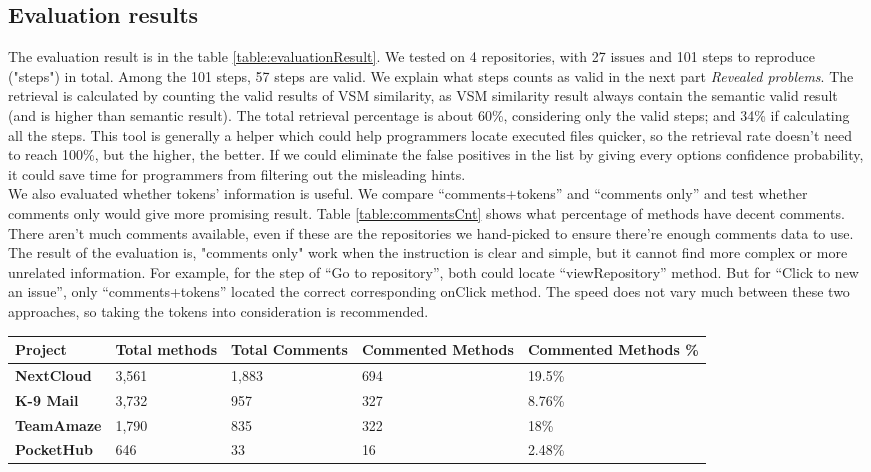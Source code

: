 \documentclass[sigconf]{acmart}
\begin{document}
\subsection{Evaluation results}
The evaluation result is in the table \ref{table:evaluationResult}. We tested on 4 repositories, with 27 issues and 101 steps to reproduce ("steps") in total. Among the 101 steps, 57 steps are valid. We explain what steps counts as valid in the next part \emph{Revealed problems}. The retrieval is calculated by counting the valid results of VSM similarity, as VSM similarity result always contain the semantic valid result (and is higher than semantic result). The total retrieval percentage is about 60\%, considering only the valid steps; and 34\% if calculating all the steps. This tool is generally a helper which could help programmers locate executed files quicker, so the retrieval rate doesn't need to reach 100\%, but the higher, the better. If we could eliminate the false positives in the list by giving every options confidence probability, it could save time for programmers from filtering out the misleading hints.\\
We also evaluated whether tokens' information is useful. We compare “comments+tokens” and “comments only” and test whether comments only would give more promising result. Table \ref{table:commentsCnt} shows what percentage of methods have decent comments. There aren't much comments available, even if these are the repositories we hand-picked to ensure there’re enough comments data to use. The result of the evaluation is, "comments only" work when the instruction is clear and simple, but it cannot find more complex or more unrelated information. For example, for the step of “Go to repository”, both could locate “viewRepository” method. But for “Click to new an issue”, only “comments+tokens” located the correct corresponding onClick method. The speed does not vary much between these two approaches, so taking the tokens into consideration is recommended.


\begin{table*}[]
	\begin{tabular}{|l|l|l|l|l|}
		\hline
		\textbf{Project}            & \textbf{Total methods} & \textbf{Total Comments} & \textbf{Commented Methods} & \textbf{Commented Methods \%} \\ \hline
		\textbf{NextCloud}          & 3,561                  & 1,883                   & 694                        & 19.5\%                        \\ \hline
		\textbf{K-9 Mail}           & 3,732                  & 957                     & 327                        & 8.76\%                        \\ \hline
		\textbf{TeamAmaze} & 1,790                  & 835                     & 322                        & 18\%                          \\ \hline
		\textbf{PocketHub}          & 646                    & 33                      & 16                         & 2.48\%                        \\ \hline
	\end{tabular}
	\caption{Comments/Methods distribution}
	\label{table:commentsCnt}
\end{table*}
\end{document}
